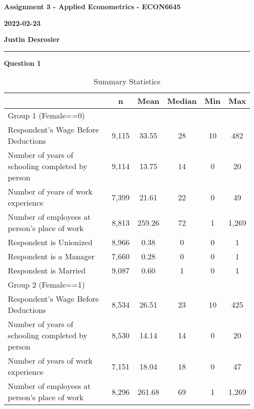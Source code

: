 \documentclass[11pt]{article}
\begin{document}


\textbf{Assignment 3 - Applied Econometrics - ECON6645}

\textbf{2022-02-23}

\textbf{Justin Desrosier}

\noindent\rule{16.51cm}{0.4pt}

\textbf{Question 1}

{
\begin{table}[ht]
\caption{Summary Statistics}
\centering
\def\sym#1{\ifmmode^{#1}\else\(^{#1}\)\fi}
\begin{tabular}{l*{1}{ccccc}}
\toprule
                    &           n&        Mean&      Median&         Min&         Max\\
\midrule
Group 1 (Female==0)                   &            &            &            &            &            \\
Respondent's Wage Before Deductions&       9,115&       33.55&          28&          10&         482\\
Number of years of schooling completed by person&       9,114&       13.75&          14&           0&          20\\
Number of years of work experience&       7,399&       21.61&          22&           0&          49\\
Number of employees at person's place of work        &       8,813&      259.26&          72&           1&       1,269\\
Respondent is Unionized&       8,966&        0.38&           0&           0&           1\\
Respondent is a Manager&       7,660&        0.28&           0&           0&           1\\
Respondent is Married&       9,087&        0.60&           1&           0&           1\\
\midrule
Group 2 (Female==1)                   &            &            &            &            &            \\
Respondent's Wage Before Deductions&       8,534&       26.51&          23&          10&         425\\
Number of years of schooling completed by person&       8,530&       14.14&          14&           0&          20\\
Number of years of work experience&       7,151&       18.04&          18&           0&          47\\
Number of employees at person's place of work        &       8,296&      261.68&          69&           1&       1,269\\

\end{tabular}
\end{table}}
\end{document}
